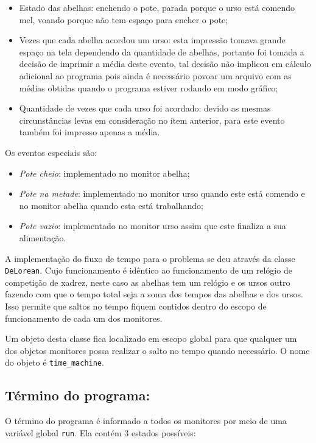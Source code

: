 \documentclass[12pt,a4paper]{article}
\begin{document}
\begin{itemize}
\item Estado das abelhas: enchendo o pote, parada porque o urso está comendo mel, voando porque não tem espaço para encher o pote;
\item Vezes que cada abelha acordou um urso: esta impressão tomava grande espaço na tela dependendo da quantidade de abelhas, portanto foi tomada a decisão de imprimir a média deste evento, tal decisão não implicou em cálculo adicional ao programa pois ainda é necessário povoar um arquivo com as médias obtidas quando o programa estiver rodando em modo gráfico;
\item Quantidade de vezes que cada urso foi acordado: devido as mesmas circunstâncias levas em consideração no ítem anterior, para este evento também foi impresso apenas a média.
\end{itemize}

Os eventos especiais são:

\begin{itemize}
\item \emph{Pote cheio}: implementado no monitor abelha;
\item \emph{Pote na metade}: implementado no monitor urso quando este está comendo e no monitor abelha quando esta está trabalhando;
\item \emph{Pote vazio}: implementado no monitor urso assim que este finaliza a sua alimentação.
\end{itemize}

A implementação do fluxo de tempo para o problema se deu através da classe \verb+DeLorean+. Cujo funcionamento é idêntico ao funcionamento de um relógio de competição de xadrez, neste caso as abelhas tem um relógio e os ursos outro fazendo com que o tempo total seja a soma dos tempos das abelhas e dos ursos. Isso permite que saltos no tempo fiquem contidos dentro do escopo de funcionamento de cada um dos monitores.

Um objeto desta classe fica localizado em escopo global para que qualquer um dos objetos monitores possa realizar o salto no tempo quando necessário. O nome do objeto é \verb+time_machine+.

\subsection{Término do programa:}

O término do programa é informado a todos os monitores por meio de uma variável global \verb+run+. Ela contém 3 estados possíveis:
\end{document}
